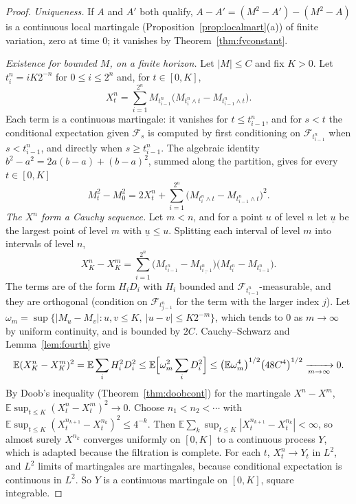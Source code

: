 \begin{proof}
\emph{Uniqueness.} If $A$ and $A'$ both qualify, $A-A'=(M^2-A')-(M^2-A)$ is a continuous local martingale (Proposition~\ref{prop:localmart}(a)) of finite variation, zero at time $0$; it vanishes by
Theorem~\ref{thm:fvconstant}.

\emph{Existence for bounded $M$, on a finite horizon.} Let $|M|\le C$ and fix $K>0$. Let $t^n_i=iK2^{-n}$ for $0\le i\le2^n$ and, for $t\in[0,K]$,
\[
X^n_t=\sum_{i=1}^{2^n}M_{t^n_{i-1}}\bigl(M_{t^n_i\wedge t}-M_{t^n_{i-1}\wedge t}\bigr).
\]
Each term is a continuous martingale: it vanishes for $t\le t^n_{i-1}$, and for $s<t$ the conditional expectation given $\mathcal F_s$ is computed by first conditioning on $\mathcal F_{t^n_{i-1}}$ when $s<t^n_{i-1}$, and
directly when $s\ge t^n_{i-1}$. The algebraic identity $b^2-a^2=2a(b-a)+(b-a)^2$, summed along the partition, gives for every $t\in[0,K]$
\begin{equation}\label{eq:qvidentity}
M_t^2-M_0^2=2X^n_t+\sum_{i=1}^{2^n}\bigl(M_{t^n_i\wedge t}-M_{t^n_{i-1}\wedge t}\bigr)^2.
\end{equation}
\emph{The $X^n$ form a Cauchy sequence.} Let $m<n$, and for a point $u$ of level $n$ let $\underline u$ be the largest point of level $m$ with $\underline u\le u$. Splitting each interval of level $m$ into intervals
of level $n$,
\[
X^n_K-X^m_K=\sum_{i=1}^{2^n}\bigl(M_{t^n_{i-1}}-M_{\underline{t^n_{i-1}}}\bigr)\bigl(M_{t^n_i}-M_{t^n_{i-1}}\bigr).
\]
The terms are of the form $H_iD_i$ with $H_i$ bounded and $\mathcal F_{t^n_{i-1}}$-measurable, and they are orthogonal (condition on $\mathcal F_{t^n_{j-1}}$ for the term with the larger index $j$). Let
$\omega_m=\sup\{|M_u-M_v|:u,v\le K,\ |u-v|\le K2^{-m}\}$, which tends to $0$ as $m\to\infty$ by uniform continuity, and is bounded by $2C$. Cauchy--Schwarz and Lemma~\ref{lem:fourth} give
\[
\mathbb E(X^n_K-X^m_K)^2=\mathbb E\sum_iH_i^2D_i^2\le\mathbb E\Bigl[\omega_m^2\sum_iD_i^2\Bigr]\le\bigl(\mathbb E\omega_m^4\bigr)^{1/2}\bigl(48C^4\bigr)^{1/2}\xrightarrow[m\to\infty]{}0.
\]
By Doob's inequality (Theorem~\ref{thm:doobcont}) for the martingale $X^n-X^m$, $\mathbb E\sup_{t\le K}(X^n_t-X^m_t)^2\to0$. Choose $n_1<n_2<\cdots$ with $\mathbb E\sup_{t\le K}(X^{n_{k+1}}_t-X^{n_k}_t)^2\le4^{-k}$.
Then $\mathbb E\sum_k\sup_{t\le K}|X^{n_{k+1}}_t-X^{n_k}_t|<\infty$, so almost surely $X^{n_k}$ converges uniformly on $[0,K]$ to a continuous process $Y$, which is adapted because the filtration is complete. For each
$t$, $X^n_t\to Y_t$ in $L^2$, and $L^2$ limits of martingales are martingales, because conditional expectation is continuous in $L^2$. So $Y$ is a continuous martingale on $[0,K]$, square integrable.


\end{proof}
